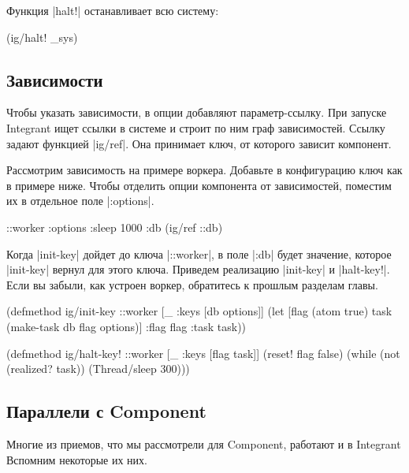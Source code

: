 Функция \spverb|halt!| останавливает всю систему:

\begin{english}
  \begin{clojure}
(ig/halt! _sys)
  \end{clojure}
\end{english}

\subsection{Зависимости}

Чтобы указать зависимости, в опции добавляют параметр-ссылку. При запуске
Integrant ищет ссылки в системе и строит по ним граф
зависимостей. Ссылку задают функцией \spverb|ig/ref|. Она принимает ключ, от
которого зависит компонент.

Рассмотрим зависимость на примере воркера. Добавьте в конфигурацию ключ как в
примере ниже. Чтобы отделить опции компонента от зависимостей, поместим их в
отдельное поле \spverb|:options|.

\begin{english}
  \begin{clojure}
{::worker {:options {:sleep 1000}
           :db (ig/ref ::db)}}
  \end{clojure}
\end{english}

Когда \spverb|init-key| дойдет до ключа \spverb|::worker|, в поле \spverb|:db|
будет значение, которое \spverb|init-key| вернул для этого ключа. Приведем
реализацию \spverb|init-key| и \spverb|halt-key!|. Если вы забыли, как устроен
воркер, обратитесь к прошлым разделам главы.

\begin{english}
  \begin{clojure}
(defmethod ig/init-key ::worker
  [_ {:keys [db options]}]
  (let [flag (atom true)
        task (make-task db flag options)]
    {:flag flag :task task}))

(defmethod ig/halt-key! ::worker
  [_ {:keys [flag task]}]
  (reset! flag false)
  (while (not (realized? task))
    (Thread/sleep 300)))
  \end{clojure}
\end{english}

\subsection{Параллели с Component}

Многие из приемов, что мы рассмотрели для Component, работают и в
Integrant Вспомним некоторые их них.

